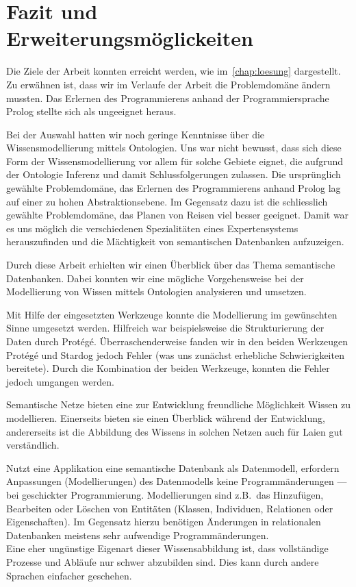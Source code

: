 \chapter{Fazit und Erweiterungsmöglickeiten}
\label{chap:fazit}


Die Ziele der Arbeit konnten erreicht werden, wie im~\autoref{chap:loesung} dargestellt. Zu erwähnen ist, dass wir im Verlaufe der Arbeit die Problemdomäne ändern mussten. Das Erlernen des Programmierens anhand der Programmiersprache Prolog stellte sich als ungeeignet heraus.

Bei der Auswahl hatten wir noch geringe Kenntnisse über die Wissensmodellierung mittels Ontologien. Uns war nicht bewusst, dass sich diese Form der Wissensmodellierung vor allem für solche Gebiete eignet, die aufgrund der Ontologie Inferenz und damit Schlussfolgerungen zulassen. Die ursprünglich gewählte Problemdomäne, das Erlernen des Programmierens anhand Prolog lag auf einer zu hohen Abstraktionsebene. Im Gegensatz dazu ist die schliesslich gewählte Problemdomäne, das Planen von Reisen viel besser geeignet. Damit war es uns möglich die verschiedenen Spezialitäten eines Expertensystems herauszufinden und die Mächtigkeit von semantischen Datenbanken aufzuzeigen.

Durch diese Arbeit erhielten wir einen Überblick über das Thema semantische Datenbanken. Dabei konnten wir eine mögliche Vorgehensweise bei der Modellierung von Wissen mittels Ontologien analysieren und umsetzen.

Mit Hilfe der eingesetzten Werkzeuge konnte die Modellierung im gewünschten Sinne umgesetzt werden. Hilfreich war beispielsweise die Strukturierung der Daten durch Protégé.
Überraschenderweise fanden wir in den beiden Werkzeugen Protégé und Stardog jedoch Fehler (was uns zunächst erhebliche Schwierigkeiten bereitete). Durch die Kombination der beiden Werkzeuge, konnten die Fehler jedoch umgangen werden.

Semantische Netze bieten eine zur Entwicklung freundliche Möglichkeit Wissen zu modellieren. Einerseits bieten sie einen Überblick während der Entwicklung, andererseits ist die Abbildung des Wissens in solchen Netzen auch für Laien gut verständlich.

Nutzt eine Applikation eine semantische Datenbank als Datenmodell, erfordern Anpassungen (Modellierungen) des Datenmodells keine Programmänderungen --- bei geschickter Programmierung. Modellierungen sind z.B.\ das Hinzufügen, Bearbeiten oder Löschen von Entitäten (Klassen, Individuen, Relationen oder Eigenschaften). Im Gegensatz hierzu benötigen Änderungen in relationalen Datenbanken meistens sehr aufwendige Programmänderungen.\\
Eine eher ungünstige Eigenart dieser Wissensabbildung ist, dass vollständige Prozesse und Abläufe nur schwer abzubilden sind. Dies kann durch andere Sprachen einfacher geschehen.

